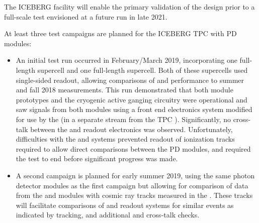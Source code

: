 The ICEBERG facility will enable the primary validation of the  design prior to a full-scale test envisioned at a future  run in late 2021. 

At least three test campaigns are planned for the ICEBERG TPC with PD modules:  

\begin{itemize}
    \item An initial test run occurred in February/March 2019, incorporating one full-length  supercell and one full-length  supercell.  Both of these supercells used single-sided readout, allowing comparisons of  and  performance to summer and fall 2018  measurements.  This run demonstrated that both module prototypes and the cryogenic active ganging circuitry were operational and saw signals from both modules using a  front end electronics system modified for use by the   (in a separate stream from the TPC ). Significantly, no cross-talk between the  and  readout electronics was observed.  Unfortunately, difficulties with the   and  systems prevented readout of ionization tracks required to allow direct comparisons between the PD modules, and required the test to end before significant progress was made.



    \item A second campaign is planned for early summer 2019, using the same photon detector modules as the first campaign but allowing for comparison of data from the  and  modules with cosmic ray tracks measured in the .  These tracks will facilitate comparisons of  and  readout systems for similar events as indicated by  tracking, and additional  and  cross-talk checks.


\end{itemize}
